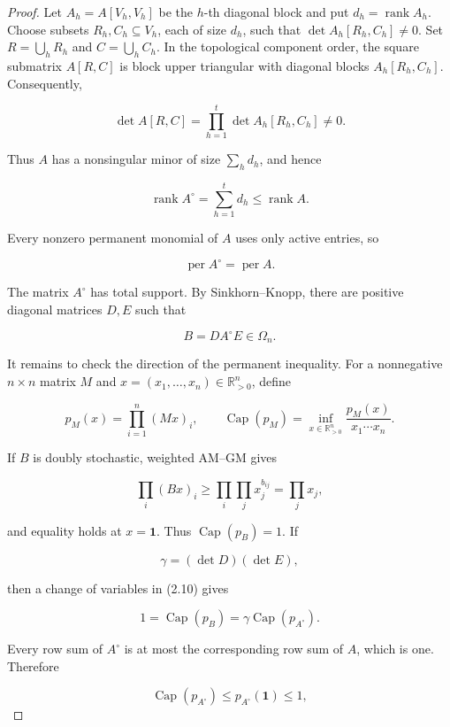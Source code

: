 \documentclass[10pt,a4paper]{amsart}
\begin{document}
\begin{proof}
Let \(A_h=A[V_h,V_h]\) be the \(h\)-th diagonal block and put
\(d_h=\operatorname{rank}A_h\). Choose subsets \(R_h,C_h\subseteq V_h\),
each of size \(d_h\), such that
\(\det A_h[R_h,C_h]\ne0\). Set \(R=\bigcup_hR_h\) and
\(C=\bigcup_hC_h\). In the topological component order, the square submatrix
\(A[R,C]\) is block upper triangular with diagonal blocks
\(A_h[R_h,C_h]\). Consequently,

\[
 \det A[R,C]=\prod_{h=1}^t\det A_h[R_h,C_h]\ne0.
\]

Thus \(A\) has a nonsingular minor of size \(\sum_h d_h\), and hence

\[
 \operatorname{rank}A^\circ=\sum_{h=1}^t d_h
 \leq\operatorname{rank}A.                                 \tag{2.7}
\]

Every nonzero permanent monomial of \(A\) uses only active entries, so

\[
 \operatorname{per}A^\circ=\operatorname{per}A.            \tag{2.8}
\]

The matrix \(A^\circ\) has total support. By Sinkhorn--Knopp, there are
positive diagonal matrices \(D,E\) such that

\[
 B=DA^\circ E\in\Omega_n.                                  \tag{2.9}
\]

It remains to check the direction of the permanent inequality. For a
nonnegative \(n\times n\) matrix \(M\) and
\(x=(x_1,\ldots,x_n)\in\mathbb R_{>0}^n\), define

\[
 p_M(x)=\prod_{i=1}^n(Mx)_i,
 \qquad
 \operatorname{Cap}(p_M)
 =\inf_{x\in\mathbb R_{>0}^n}
   \frac{p_M(x)}{x_1\cdots x_n}.                         \tag{2.10}
\]

If \(B\) is doubly stochastic, weighted AM--GM gives

\[
 \prod_i(Bx)_i
 \geq\prod_i\prod_jx_j^{b_{ij}}
 =\prod_jx_j,
\]

and equality holds at \(x=\mathbf1\). Thus
\(\operatorname{Cap}(p_B)=1\). If

\[
 \gamma=(\det D)(\det E),
\]

then a change of variables in (2.10) gives

\[
 1=\operatorname{Cap}(p_B)
 =\gamma\operatorname{Cap}(p_{A^\circ}).                  \tag{2.11}
\]

Every row sum of \(A^\circ\) is at most the corresponding row sum of \(A\),
which is one. Therefore

\[
 \operatorname{Cap}(p_{A^\circ})
 \leq p_{A^\circ}(\mathbf1)\leq1,                         \tag{2.12}
\]


\end{proof}
\end{document}
